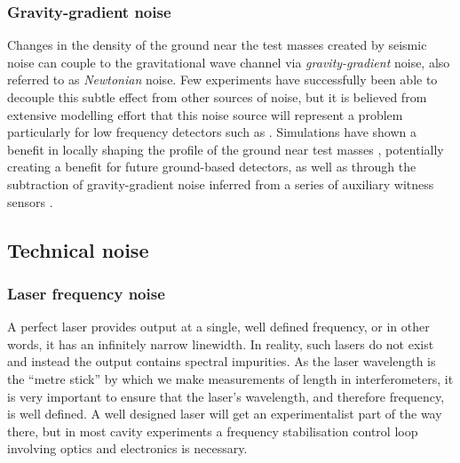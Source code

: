 \subsubsection{Gravity-gradient noise}
Changes in the density of the ground near the test masses created by seismic noise can couple to the gravitational wave channel via \emph{gravity-gradient} noise, also referred to as \emph{Newtonian} noise. Few experiments have successfully been able to decouple this subtle effect from other sources of noise, but it is believed from extensive modelling effort that this noise source will represent a problem particularly for low frequency detectors such as \ETLF{} \cite{ET2011, Hild2011}. Simulations have shown a benefit in locally shaping the profile of the ground near test masses \cite{Harms2014}, potentially creating a benefit for future ground-based detectors, as well as through the subtraction of gravity-gradient noise inferred from a series of auxiliary witness sensors \cite{Harms2015}.

\subsection{Technical noise}

\subsubsection{Laser frequency noise}
A perfect laser provides output at a single, well defined frequency, or in other words, it has an infinitely narrow linewidth. In reality, such lasers do not exist and instead the output contains spectral impurities. As the laser wavelength is the ``metre stick'' by which we make measurements of length in interferometers, it is very important to ensure that the laser's wavelength, and therefore frequency, is well defined. A well designed laser will get an experimentalist part of the way there, but in most cavity experiments a frequency stabilisation control loop involving optics and electronics is necessary.

